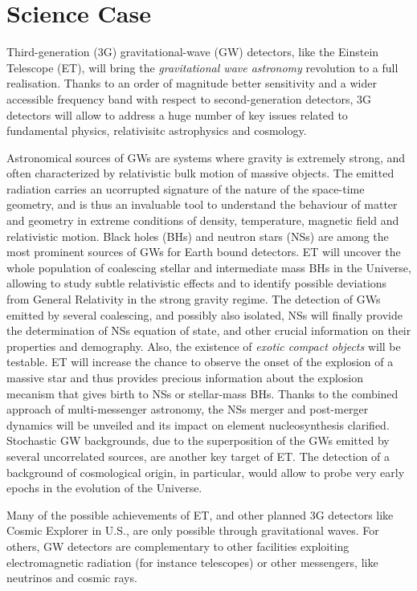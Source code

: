 \chapter{Science Case}
\label{chap:ScienceCase}
Third-generation (3G) gravitational-wave (GW) detectors, like the Einstein Telescope (ET), will bring the {\it gravitational wave astronomy} revolution to a full realisation. Thanks to an order of magnitude better sensitivity and a wider accessible frequency band with respect to second-generation detectors, 3G detectors will allow to address a huge number of key issues related to fundamental physics, relativisitc astrophysics and cosmology. 

Astronomical sources of GWs are systems where gravity is extremely strong, and often characterized by relativistic bulk motion of massive objects. The emitted radiation carries an ucorrupted signature of the nature of the space-time geometry, and is thus an invaluable tool to understand the behaviour of matter and geometry in extreme conditions of density, temperature, magnetic field and relativistic motion.
Black holes (BHs) and neutron stars (NSs) are among the most prominent sources of GWs for Earth bound detectors. ET will uncover the whole population of coalescing stellar and intermediate mass BHs in the Universe, allowing to study subtle relativistic effects and to identify possible deviations from General Relativity in the strong gravity regime. The detection of GWs emitted by several coalescing, and possibly also isolated, NSs will finally provide the determination of NSs equation of state, and other crucial information on their properties and demography. Also, the existence of {\it exotic compact objects} will be testable.
ET will increase the chance to observe the onset of the explosion of a massive star and thus provides precious information about the explosion mecanism that gives birth to NSs or stellar-mass BHs. 
Thanks to the combined approach of multi-messenger astronomy, the NSs merger and post-merger dynamics will be unveiled and its impact on element nucleosynthesis clarified. Stochastic GW backgrounds, due to the superposition of the GWs emitted by several uncorrelated sources, are another key target of ET. The detection of a background of cosmological origin, in particular, would allow to probe very early epochs in the evolution of the Universe. 

Many of the possible achievements of ET, and other planned 3G detectors like Cosmic Explorer in U.S., are only possible through gravitational waves. For others, GW detectors are complementary to other facilities exploiting electromagnetic radiation (for instance telescopes) or other messengers, like neutrinos and cosmic rays. 

